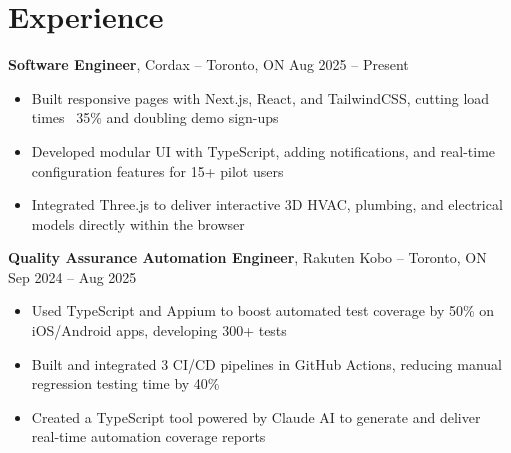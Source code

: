 

\section*{Experience}
\textbf{Software Engineer}, {Cordax} -- Toronto, ON \hfill Aug 2025 -- Present \\
\vspace{-5pt}
\begin{itemize}
  \item Built responsive pages with Next.js, React, and TailwindCSS, cutting load times ~35\% and doubling demo sign-ups
  \item Developed modular UI with TypeScript, adding notifications, and real-time configuration features for 15+ pilot users
  \item Integrated Three.js to deliver interactive 3D HVAC, plumbing, and electrical models directly within the browser
\end{itemize}
\textbf{Quality Assurance Automation Engineer}, {Rakuten Kobo} -- Toronto, ON \hfill Sep 2024 -- Aug 2025 \\
\vspace{-5pt}
\begin{itemize}
  \item Used TypeScript and Appium to boost automated test coverage by 50\% on iOS/Android apps, developing 300+ tests
  \item Built and integrated 3 CI/CD pipelines in GitHub Actions, reducing manual regression testing time by 40\%
  \item Created a TypeScript tool powered by Claude AI to generate and deliver real-time automation coverage reports
\end{itemize}

